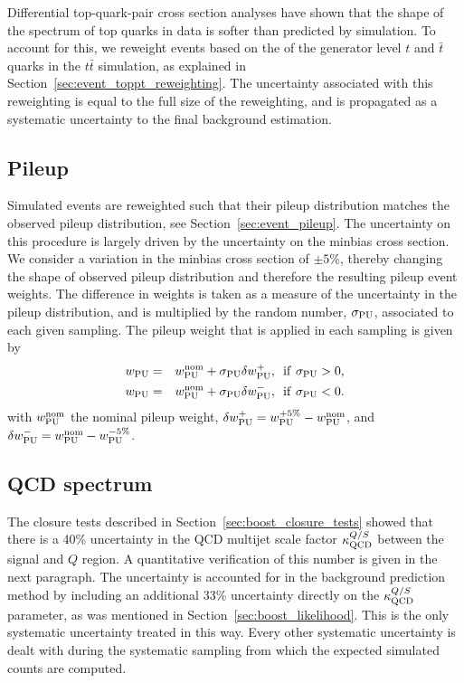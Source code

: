 Differential top-quark-pair cross section analyses have shown that the shape of the \pt spectrum of 
top quarks in data is softer than predicted by simulation. 
To account for this, we reweight events based on the \pt of the generator level $t$ and $\bar{t}$
quarks in the $t\bar{t}$ simulation, as explained in Section~\ref{sec:event_toppt_reweighting}. 
The uncertainty associated with this reweighting is equal to the full size of the
reweighting, and is propagated as a systematic uncertainty to the final background estimation. 

\subsection{Pileup} 

Simulated events are reweighted such that their pileup distribution matches the observed pileup
distribution, see Section~\ref{sec:event_pileup}. The uncertainty on this procedure is largely
driven by the uncertainty on the minbias cross section. We consider a variation in the minbias cross
section of $\pm 5\%$, thereby changing the shape of observed pileup distribution and
therefore the resulting pileup event weights. The difference in weights is taken as a measure of the
uncertainty in the pileup distribution, and is multiplied by the random number, $\sigma_{\rm PU}$,
associated to each given sampling.  The pileup weight that is applied in each sampling is given by
\begin{eqnarray}
w_{\rm PU} & = & w_{\rm PU}^{\rm nom} + \sigma_{\rm PU}\delta w^+_{\rm PU}, \,\,\, {\rm if}
\,\, \sigma_{\rm PU} > 0, \\ 
w_{\rm PU} & = & w_{\rm PU}^{\rm nom} + \sigma_{\rm PU}\delta w^-_{\rm PU}, \,\,\, {\rm if}
\,\, \sigma_{\rm PU} < 0. 
\end{eqnarray}
with $w_{\rm PU}^{\rm nom}$ the nominal pileup weight, $\delta w^+_{\rm PU} = w_{\rm PU}^{+5\%} -
w_{\rm PU}^{\rm nom}$, and $\delta w^-_{\rm PU} = w_{\rm PU}^{\rm nom} - w_{\rm PU}^{-5\%}$.

\subsection{QCD spectrum} 

The closure tests described in Section~\ref{sec:boost_closure_tests} showed that there is a 40\%
uncertainty in the QCD multijet scale factor $\kappa_{\rm QCD}^{Q/S}$ between the signal and $Q$
region. 
A quantitative verification of this number is given in the next paragraph. 
The uncertainty is accounted for in the background prediction method by including an additional 33\%
uncertainty directly on the $\kappa_{\rm QCD}^{Q/S}$ parameter, as was mentioned in
Section~\ref{sec:boost_likelihood}.
This is the only systematic uncertainty treated in this way. Every other systematic uncertainty is
dealt with during the systematic sampling from which the expected simulated counts are computed.

